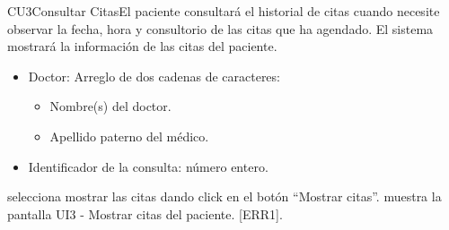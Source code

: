 \begin{UseCase}{CU3}{Consultar Citas}{El paciente consultará el historial de citas cuando necesite observar la fecha, hora y consultorio de las citas que ha agendado. El sistema mostrará la información de las citas del paciente.}
{\begin{itemize}
\begin{itemize}
				\item Doctor: Arreglo de dos cadenas de caracteres:
				\begin{itemize}
					\item Nombre(s) del doctor.
					\item Apellido paterno del médico.
		        \end{itemize}
		        \item Identificador de la consulta: número entero.
		    \end{itemize}
		\end{itemize}
	}
	
	
\end{UseCase}

\begin{UCtrayectoria}{}
		\UCpaso[\UCactor] selecciona mostrar las citas dando click en el botón ``Mostrar citas''.
		\UCpaso muestra la pantalla UI3 - Mostrar citas del paciente. [ERR1].
\end{UCtrayectoria}
